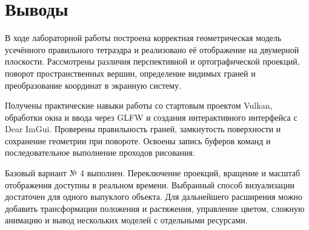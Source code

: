 \clearpage
\section{Выводы}

В ходе лабораторной работы построена корректная геометрическая модель усечённого правильного тетраэдра и реализовано её отображение на двумерной плоскости. Рассмотрены различия перспективной и ортографической проекций, поворот пространственных вершин, определение видимых граней и преобразование координат в экранную систему.

Получены практические навыки работы со стартовым проектом Vulkan, обработки окна и ввода через GLFW и создания интерактивного интерфейса с Dear ImGui. Проверены правильность граней, замкнутость поверхности и сохранение геометрии при повороте. Освоены запись буферов команд и последовательное выполнение проходов рисования.

Базовый вариант № 4 выполнен. Переключение проекций, вращение и масштаб отображения доступны в реальном времени. Выбранный способ визуализации достаточен для одного выпуклого объекта. Для дальнейшего расширения можно добавить трансформации положения и растяжения, управление цветом, сложную анимацию и вывод нескольких моделей с отдельными ресурсами.
